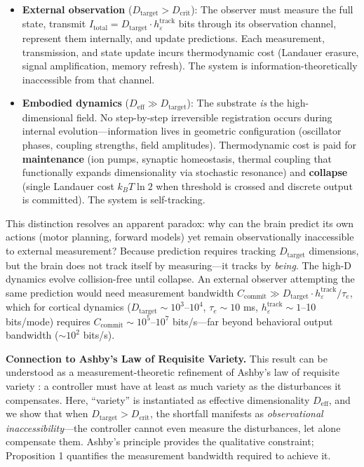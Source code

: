 \documentclass[12pt]{article}
\begin{document}
\begin{itemize}
\item \textbf{External observation} ($D_{\text{target}} > D_{\text{crit}}$): The observer must measure the full state, transmit $I_{\text{total}} = D_{\text{target}} \cdot h_\varepsilon^{\text{track}}$ bits through its observation channel, represent them internally, and update predictions. Each measurement, transmission, and state update incurs thermodynamic cost (Landauer erasure, signal amplification, memory refresh). The system is information-theoretically inaccessible from that channel.

\item \textbf{Embodied dynamics} ($D_{\text{eff}} \gg D_{\text{target}}$): The substrate \textit{is} the high-dimensional field. No step-by-step irreversible registration occurs during internal evolution---information lives in geometric configuration (oscillator phases, coupling strengths, field amplitudes). Thermodynamic cost is paid for \textbf{maintenance} (ion pumps, synaptic homeostasis, thermal coupling that functionally expands dimensionality via stochastic resonance) and \textbf{collapse} (single Landauer cost $k_B T \ln 2$ when threshold is crossed and discrete output is committed). The system is self-tracking.
\end{itemize}

This distinction resolves an apparent paradox: why can the brain predict its own actions (motor planning, forward models) yet remain observationally inaccessible to external measurement? Because prediction requires tracking $D_{\text{target}}$ dimensions, but the brain does not track itself by measuring---it tracks by \textit{being}. The high-D dynamics evolve collision-free until collapse. An external observer attempting the same prediction would need measurement bandwidth $C_{\text{commit}} \gg D_{\text{target}} \cdot h_\varepsilon^{\text{track}} / \tau_e$, which for cortical dynamics ($D_{\text{target}} \sim 10^3$--$10^4$, $\tau_e \sim 10$ ms, $h_\varepsilon^{\text{track}} \sim 1$--10 bits/mode) requires $C_{\text{commit}} \sim 10^5$--$10^7$ bits/s---far beyond behavioral output bandwidth ($\sim 10^2$ bits/s).

\textbf{Connection to Ashby's Law of Requisite Variety.} This result can be understood as a measurement-theoretic refinement of Ashby's law of requisite variety \cite{ashby1956}: a controller must have at least as much variety as the disturbances it compensates. Here, ``variety'' is instantiated as effective dimensionality $D_{\text{eff}}$, and we show that when $D_{\text{target}} > D_{\text{crit}}$, the shortfall manifests as \textit{observational inaccessibility}---the controller cannot even measure the disturbances, let alone compensate them. Ashby's principle provides the qualitative constraint; Proposition 1 quantifies the measurement bandwidth required to achieve it.
\end{document}
